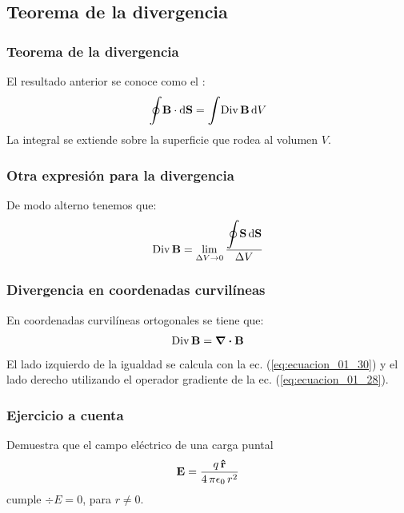 \documentclass[12pt]{beamer}
\begin{document}
\subsection{Teorema de la divergencia}

\begin{frame}
\frametitle{Teorema de la divergencia}
El resultado anterior se conoce como el :
\pause
\begin{align}
\scaleoint{6ex} \vb{B} \cdot \dd{\vb{S}} = \scaleint{6ex} {\rm Div} \, \vb{B} \dd{V}
\label{eq:ecuacion_01_31}
\end{align}
La integral se extiende sobre la superficie que rodea al volumen $V$.
\end{frame}
\begin{frame}
\frametitle{Otra expresión para la divergencia}
De modo alterno tenemos que:
\pause
\begin{align*}
{\rm Div} \, \vb{B} = \lim_{\Delta V \to 0} \dfrac{\displaystyle \scaleoint{6ex} \vb{S} \dd{\vb{S}}}{\Delta V}
\end{align*}
\end{frame}
\begin{frame}
\frametitle{Divergencia en coordenadas curvilíneas}
En coordenadas curvilíneas ortogonales se tiene que:
\pause
\begin{align*}
{\rm Div} \, \vb{B} = \div{\vb{B}}
\end{align*}
\pause
El lado izquierdo de la igualdad se calcula con la ec. (\ref{eq:ecuacion_01_30}) y el lado derecho utilizando el operador gradiente de la ec. (\ref{eq:ecuacion_01_28}).
\end{frame}
\begin{frame}
\frametitle{Ejercicio a cuenta}
Demuestra que el campo eléctrico de una carga puntal
\begin{align*}
\vb{E} = \dfrac{q \, \vu{r}}{4 \, \pi \epsilon_{0} \, r^{2}}
\end{align*}
cumple $\div{E} = 0$, para $r \neq 0$.
\end{frame}
\end{document}
